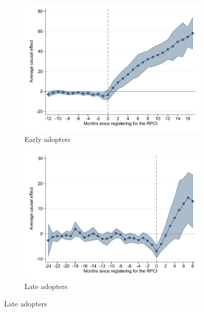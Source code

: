 \documentclass[oneside,11pt]{article}
\begin{document}
\begin{figure}[H]
    \caption{Event studies - RPCI effect on wage by cohort}
    \label{event_study_cohort}
    \begin{center}
    
    \begin{subfigure}{0.49\textwidth}
    \caption{Early adopters}
    \includegraphics[width=\textwidth]{04_Figures/muestra_10porciento/event_study_sal_cierre_chaisemartin_adopters_early.pdf}
    \end{subfigure}
    \begin{subfigure}{0.49\textwidth}
    \caption{Late adopters}
    \includegraphics[width=\textwidth]{04_Figures/muestra_10porciento/event_study_sal_cierre_chaisemartin_adopters_late.pdf}
    \end{subfigure}
    
    \end{center}
\end{figure}
\end{document}
